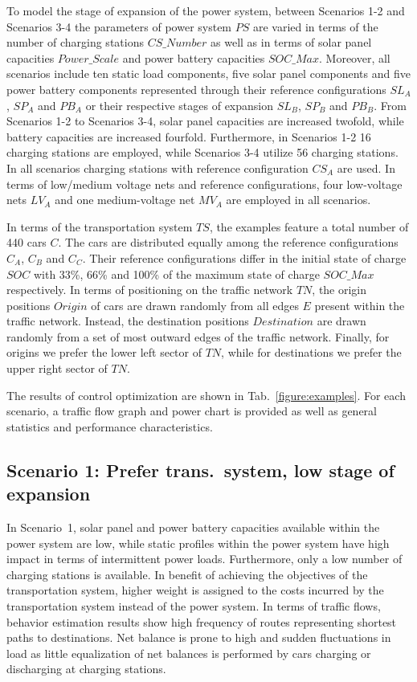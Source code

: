 To model the stage of expansion of the power system, between Scenarios 1-2 and Scenarios 3-4 the parameters of power system $PS$ are varied in terms of the number of charging stations $CS\_Number$ as well as in terms of solar panel capacities $Power\_Scale$ and power battery capacities $SOC\_Max$. Moreover, all scenarios include ten static load components, five solar panel components and five power battery components represented through their reference configurations $SL_{A}$, $SP_{A}$ and $PB_{A}$ or their respective stages of expansion $SL_{B}$, $SP_{B}$ and $PB_{B}$. From Scenarios 1-2 to Scenarios 3-4, solar panel capacities are increased twofold, while battery capacities are increased fourfold. Furthermore, in Scenarios 1-2 16 charging stations are employed, while Scenarios 3-4 utilize 56 charging stations. In all scenarios charging stations with reference configuration $CS_{A}$ are used. In terms of low/medium voltage nets and reference configurations, four low-voltage nets $LV_{A}$ and one medium-voltage net $MV_{A}$ are employed in all scenarios. 

In terms of the transportation system $TS$, the examples feature a total number of 440 cars $C$. The cars are distributed equally among the reference configurations $C_{A}$, $C_{B}$ and $C_{C}$. Their reference configurations differ in the initial state of charge $SOC$ with 33\%, 66\% and 100\% of the maximum state of charge $SOC\_Max$ respectively. In terms of positioning on the traffic network $TN$, the origin positions $Origin$ of cars are drawn randomly from all edges $E$ present within the traffic network. Instead, the destination positions $Destination$ are drawn randomly from a set of most outward edges of the traffic network. Finally, for origins we prefer the lower left sector of $TN$, while for destinations we prefer the upper right sector of $TN$.

The results of control optimization are shown in Tab.~\ref{figure:examples}. For each scenario, a traffic flow graph and power chart is provided as well as general statistics and performance characteristics.

\subsection*{Scenario 1: Prefer trans.\ system, low stage of expansion}

In Scenario~1, solar panel and power battery capacities available within the power system are low, while static profiles within the power system have high impact in terms of intermittent power loads. Furthermore, only a low number of charging stations is available. In benefit of achieving the objectives of the transportation system, higher weight is assigned to the costs incurred by the transportation system instead of the power system. In terms of traffic flows, behavior estimation results show high frequency of routes representing shortest paths to destinations. Net balance is prone to high and sudden fluctuations in load as little equalization of net balances is performed by cars charging or discharging at charging stations.

